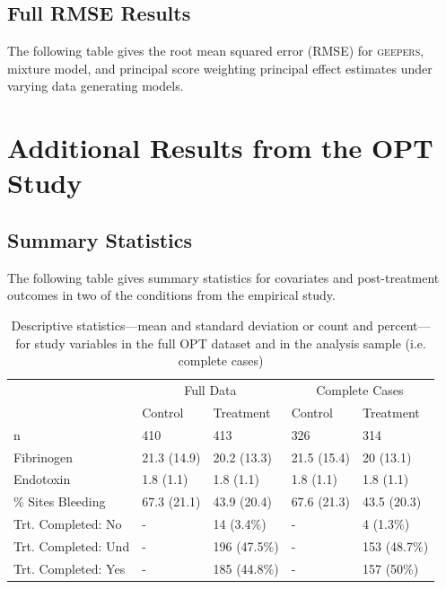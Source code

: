 \documentclass[]{article}
\begin{document}
\clearpage
\subsection{Full RMSE Results}
The following table gives the root mean squared error (RMSE) for \textsc{geepers}, mixture model, and principal score weighting principal effect estimates under varying data generating models.\\


\clearpage

\section{Additional Results from the OPT Study}
\singlespacing
\subsection{Summary Statistics}
The following table gives summary statistics for covariates and post-treatment outcomes in two of the conditions from the empirical study.\\

\begin{table}

\caption{\label{tab:tab:optTab1}Descriptive statistics---mean and standard deviation or count and percent---for study variables in the full OPT dataset and in the analysis sample (i.e. complete cases)}
\centering
\begin{tabular}[t]{lllll}
\toprule
\multicolumn{1}{c}{ } & \multicolumn{2}{c}{Full Data} & \multicolumn{2}{c}{Complete Cases} \\
\cmidrule(l{3pt}r{3pt}){2-3} \cmidrule(l{3pt}r{3pt}){4-5}
  & Control & Treatment & Control & Treatment\\
\midrule
n & 410 & 413 & 326 & 314\\
Fibrinogen & 21.3 (14.9) & 20.2 (13.3) & 21.5 (15.4) & 20 (13.1)\\
Endotoxin & 1.8 (1.1) & 1.8 (1.1) & 1.8 (1.1) & 1.8 (1.1)\\
\% Sites Bleeding & 67.3 (21.1) & 43.9 (20.4) & 67.6 (21.3) & 43.5 (20.3)\\
Trt. Completed: No & - & 14 (3.4\%) & - & 4 (1.3\%)\\
\addlinespace
Trt. Completed: Und & - & 196 (47.5\%) & - & 153 (48.7\%)\\
Trt. Completed: Yes & - & 185 (44.8\%) & - & 157 (50\%)\\
\bottomrule
\end{tabular}
\end{table}
\end{document}
